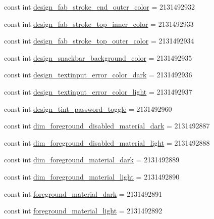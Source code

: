 \begin{CompactItemize}
const int \hyperlink{class__2doo_1_1_droid_1_1_resource_1_1_color_c968101b26ff2fa52a3a155077a14c78}{design\_\-fab\_\-stroke\_\-end\_\-outer\_\-color} = 2131492932
\item 
const int \hyperlink{class__2doo_1_1_droid_1_1_resource_1_1_color_86a0768d37ec2008fde3716132b56d08}{design\_\-fab\_\-stroke\_\-top\_\-inner\_\-color} = 2131492933
\item 
const int \hyperlink{class__2doo_1_1_droid_1_1_resource_1_1_color_a64311b562aeaafa361f82132e47c17a}{design\_\-fab\_\-stroke\_\-top\_\-outer\_\-color} = 2131492934
\item 
const int \hyperlink{class__2doo_1_1_droid_1_1_resource_1_1_color_d99c0a51441aa9c217419d1b7fce7102}{design\_\-snackbar\_\-background\_\-color} = 2131492935
\item 
const int \hyperlink{class__2doo_1_1_droid_1_1_resource_1_1_color_ddacf7821f2eb7a0a0bf29969b426e36}{design\_\-textinput\_\-error\_\-color\_\-dark} = 2131492936
\item 
const int \hyperlink{class__2doo_1_1_droid_1_1_resource_1_1_color_78aea1b3da634424d7657c3db81985a4}{design\_\-textinput\_\-error\_\-color\_\-light} = 2131492937
\item 
const int \hyperlink{class__2doo_1_1_droid_1_1_resource_1_1_color_ab1b29a961c7c91a7387b4dfdbdf0597}{design\_\-tint\_\-password\_\-toggle} = 2131492960
\item 
const int \hyperlink{class__2doo_1_1_droid_1_1_resource_1_1_color_56b49f3eb132b142c7eabdb2a604e1e2}{dim\_\-foreground\_\-disabled\_\-material\_\-dark} = 2131492887
\item 
const int \hyperlink{class__2doo_1_1_droid_1_1_resource_1_1_color_ee07d0a0601d929c601b55f6d581b4b5}{dim\_\-foreground\_\-disabled\_\-material\_\-light} = 2131492888
\item 
const int \hyperlink{class__2doo_1_1_droid_1_1_resource_1_1_color_83976c38586b8409b0c2b70591040e40}{dim\_\-foreground\_\-material\_\-dark} = 2131492889
\item 
const int \hyperlink{class__2doo_1_1_droid_1_1_resource_1_1_color_106e543e02894a3b7e44766d255a8ec4}{dim\_\-foreground\_\-material\_\-light} = 2131492890
\item 
const int \hyperlink{class__2doo_1_1_droid_1_1_resource_1_1_color_dfa4bdb32a669895743cac3e67381b89}{foreground\_\-material\_\-dark} = 2131492891
\item 
const int \hyperlink{class__2doo_1_1_droid_1_1_resource_1_1_color_3ef5f2d8bb3b87495a455e5bb982ea47}{foreground\_\-material\_\-light} = 2131492892

\end{CompactItemize}
